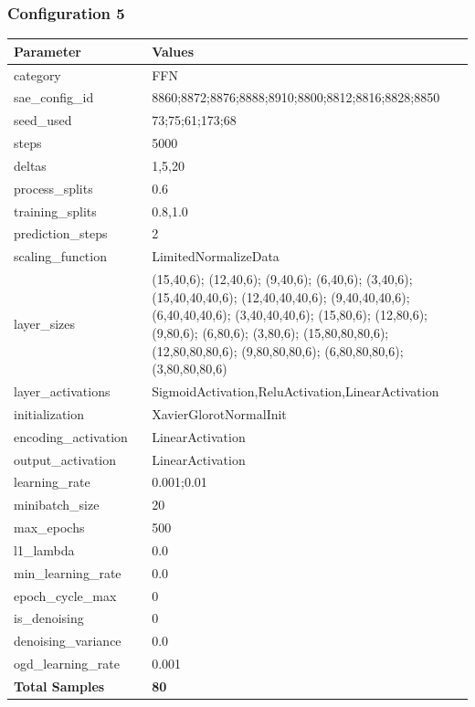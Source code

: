 \documentclass[a4paper,11pt,oneside]{article}
\theoremstyle{plain}
\theoremstyle{definition}
\begin{document}
	\newpage
	\subsubsection{Configuration 5}\label{config5}
	\begin{longtable}[H]{|p{0.3\linewidth}|p{0.7\linewidth}|} \hline 			\rowcolor{beaublue}\textbf{Parameter} &\textbf{Values} \\\hline{category} & {FFN} \\\hline
		{sae\_config\_id} & {8860;8872;8876;8888;8910;8800;8812;8816;8828;8850} \\\hline
		{seed\_used} & {73;75;61;173;68} \\\hline
		{steps} & {5000} \\\hline
		{deltas} & {1,5,20} \\\hline
		{process\_splits} & {0.6} \\\hline
		{training\_splits} & {0.8,1.0} \\\hline
		{prediction\_steps} & {2} \\\hline
		{scaling\_function} & {LimitedNormalizeData} \\\hline
		{layer\_sizes} & {(15,40,6); (12,40,6); (9,40,6); (6,40,6); (3,40,6); (15,40,40,40,6); (12,40,40,40,6); (9,40,40,40,6); (6,40,40,40,6); (3,40,40,40,6); (15,80,6); (12,80,6); (9,80,6); (6,80,6); (3,80,6); (15,80,80,80,6); (12,80,80,80,6); (9,80,80,80,6); (6,80,80,80,6); (3,80,80,80,6)} \\\hline
		{layer\_activations} & {SigmoidActivation,ReluActivation,LinearActivation} \\\hline
		{initialization} & {XavierGlorotNormalInit} \\\hline
		{encoding\_activation} & {LinearActivation} \\\hline
		{output\_activation} & {LinearActivation} \\\hline
		{learning\_rate} & {0.001;0.01} \\\hline
		{minibatch\_size} & {20} \\\hline
		{max\_epochs} & {500} \\\hline
		{l1\_lambda} & {0.0} \\\hline
		{min\_learning\_rate} & {0.0} \\\hline
		{epoch\_cycle\_max} & {0} \\\hline
		{is\_denoising} & {0} \\\hline
		{denoising\_variance} & {0.0} \\\hline
		{ogd\_learning\_rate} & {0.001} \\\hline
		{\textbf{Total Samples}} & {\textbf{80}} \\\hline
	\end{longtable}
\end{document}
